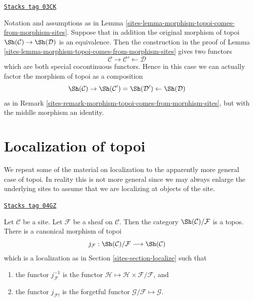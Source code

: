 \begin{remark}
\label{sites-remark-equivalence-topoi-comes-from-morphism-sites}
\href{https://stacks.math.columbia.edu/tag/03CK}{\texttt{Stacks tag 03CK}}

Notation and assumptions
as in Lemma \ref{sites-lemma-morphism-topoi-comes-from-morphism-sites}.
Suppose that in addition the original morphism of topoi
$\Sh(\mathcal{C}) \to \Sh(\mathcal{D})$ is an equivalence.
Then the construction in the proof of
Lemma \ref{sites-lemma-morphism-topoi-comes-from-morphism-sites}
gives two functors
$$
\mathcal{C} \rightarrow \mathcal{C}' \leftarrow \mathcal{D}
$$
which are both special cocontinuous functors.
Hence in this case we can actually
factor the morphism of topoi as a composition
$$
\Sh(\mathcal{C}) \rightarrow
\Sh(\mathcal{C}') =
\Sh(\mathcal{D}') \leftarrow
\Sh(\mathcal{D})
$$
as in Remark \ref{sites-remark-morphism-topoi-comes-from-morphism-sites}, but
with the middle morphism an identity.
\end{remark}

\section{Localization of topoi}
\label{sites-section-localize-topoi}
We repeat some of the material on localization to
the apparently more general case of topoi. In reality this is not
more general since we may always enlarge the underlying sites
to assume that we are localizing at objects of the site.

\begin{lemma}
\label{sites-lemma-localize-topos}
\href{https://stacks.math.columbia.edu/tag/04GZ}{\texttt{Stacks tag 04GZ}}

Let $\mathcal{C}$ be a site.
Let $\mathcal{F}$ be a sheaf on $\mathcal{C}$.
Then the category $\Sh(\mathcal{C})/\mathcal{F}$
is a topos. There is a canonical morphism of topoi
$$
j_\mathcal{F} :
\Sh(\mathcal{C})/\mathcal{F}
\longrightarrow
\Sh(\mathcal{C})
$$
which is a localization as in
Section \ref{sites-section-localize}
such that
\begin{enumerate}
\item the functor $j_\mathcal{F}^{-1}$ is the functor
$\mathcal{H} \mapsto \mathcal{H} \times \mathcal{F}/\mathcal{F}$, and
\item the functor $j_{\mathcal{F}!}$ is the forgetful
functor $\mathcal{G}/\mathcal{F} \mapsto \mathcal{G}$.
\end{enumerate}
\end{lemma}


